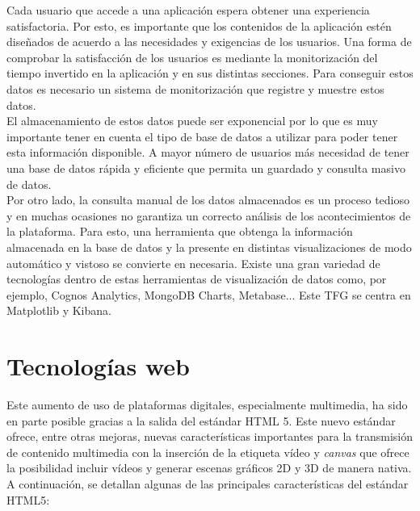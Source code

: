 \documentclass[a4paper, 12pt]{book}
\begin{document}
		Cada usuario que accede a una aplicación espera obtener una experiencia satisfactoria. Por esto, es importante que los contenidos de la aplicación estén diseñados de acuerdo a las necesidades y exigencias de los usuarios. Una forma de comprobar la satisfacción de los usuarios es mediante la monitorización del tiempo invertido en la aplicación y en sus distintas secciones. Para conseguir estos datos es necesario un sistema de monitorización que registre y muestre estos datos. \\
		
		El almacenamiento de estos datos puede ser exponencial por lo que es muy importante tener en cuenta el tipo de base de datos a utilizar para poder tener esta información disponible. A mayor número de usuarios más necesidad de tener una base de datos rápida y eficiente que permita un guardado y consulta masivo de datos. \\
		
		Por otro lado, la consulta manual de los datos almacenados es un proceso tedioso y en muchas ocasiones no garantiza un correcto análisis de los acontecimientos de la plataforma. Para esto, una herramienta que obtenga la información almacenada en la base de datos y la presente en distintas visualizaciones de modo automático y vistoso se convierte en necesaria. Existe una gran variedad de tecnologías dentro de estas herramientas de visualización de datos como, por ejemplo, Cognos Analytics, MongoDB Charts, Metabase... Este TFG se centra en Matplotlib y Kibana.
	
	
	\section{Tecnologías web}
	\label{sec:introduccion_tecnologias_web}	
		
		Este aumento de uso de plataformas digitales, especialmente multimedia, ha sido en parte posible gracias a la salida del estándar HTML 5. Este nuevo estándar ofrece, entre otras mejoras, nuevas características importantes para la transmisión de contenido multimedia con la inserción de la etiqueta vídeo y \textit{canvas} que ofrece la posibilidad incluir vídeos y generar escenas gráficos 2D y 3D de manera nativa. A continuación, se detallan algunas de las principales características del estándar HTML5:
		
\end{document}
